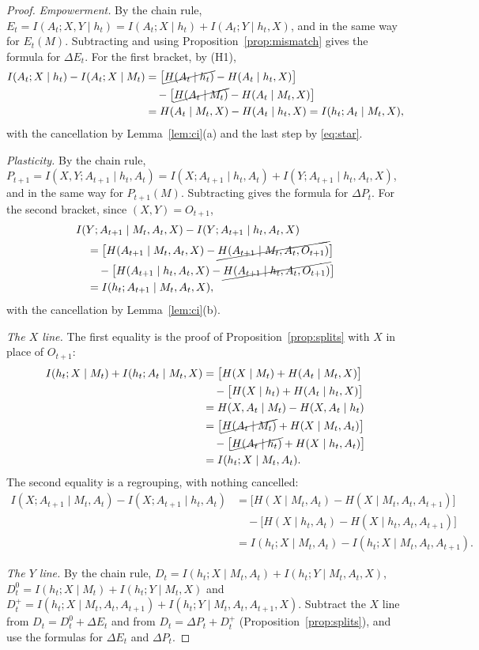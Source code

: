 \documentclass{article}
\theoremstyle{definition}
\theoremstyle{remark}
\newcommand{\dE}{\Delta E}
\newcommand{\dP}{\Delta P}
\begin{document}
\begin{proof}
\emph{Empowerment.} By the chain rule, $E_t=I(A_t;X,Y\mid h_t)=I(A_t;X\mid h_t)+I(A_t;Y\mid h_t,X)$, and in the same way for $E_t(M)$. Subtracting and using Proposition~\ref{prop:mismatch} gives the formula for $\dE_t$. For the first bracket, by (H1),
\begin{align*}
I(A_t;X\mid h_t)-I(A_t;X\mid M_t)
&=\big[\cancel{H(A_t\mid h_t)}-H(A_t\mid h_t,X)\big]\\
&\quad-\big[\cancel{H(A_t\mid M_t)}-H(A_t\mid M_t,X)\big]\\
&=H(A_t\mid M_t,X)-H(A_t\mid h_t,X)=I(h_t;A_t\mid M_t,X),
\end{align*}
with the cancellation by Lemma~\ref{lem:ci}(a) and the last step by \eqref{eq:star}.

\emph{Plasticity.} By the chain rule, $P_{t+1}=I(X,Y;A_{t+1}\mid h_t,A_t)=I(X;A_{t+1}\mid h_t,A_t)+I(Y;A_{t+1}\mid h_t,A_t,X)$, and in the same way for $P_{t+1}(M)$. Subtracting gives the formula for $\dP_t$. For the second bracket, since $(X,Y)=O_{t+1}$,
\begin{align*}
&I(Y;A_{t+1}\mid M_t,A_t,X)-I(Y;A_{t+1}\mid h_t,A_t,X)\\
&\quad=\big[H(A_{t+1}\mid M_t,A_t,X)-\cancel{H(A_{t+1}\mid M_t,A_t,O_{t+1})}\big]\\
&\qquad-\big[H(A_{t+1}\mid h_t,A_t,X)-\cancel{H(A_{t+1}\mid h_t,A_t,O_{t+1})}\big]\\
&\quad=I(h_t;A_{t+1}\mid M_t,A_t,X),
\end{align*}
with the cancellation by Lemma~\ref{lem:ci}(b).

\emph{The $X$ line.} The first equality is the proof of Proposition~\ref{prop:splits} with $X$ in place of $O_{t+1}$:
\begin{align*}
I(h_t;X\mid M_t)+I(h_t;A_t\mid M_t,X)
&=\big[H(X\mid M_t)+H(A_t\mid M_t,X)\big]\\
&\quad-\big[H(X\mid h_t)+H(A_t\mid h_t,X)\big]\\
&=H(X,A_t\mid M_t)-H(X,A_t\mid h_t)\\
&=\big[\cancel{H(A_t\mid M_t)}+H(X\mid M_t,A_t)\big]\\
&\quad-\big[\cancel{H(A_t\mid h_t)}+H(X\mid h_t,A_t)\big]\\
&=I(h_t;X\mid M_t,A_t).
\end{align*}
The second equality is a regrouping, with nothing cancelled:
\begin{align*}
I(X;A_{t+1}\mid M_t,A_t)-I(X;A_{t+1}\mid h_t,A_t)
&=\big[H(X\mid M_t,A_t)-H(X\mid M_t,A_t,A_{t+1})\big]\\
&\quad-\big[H(X\mid h_t,A_t)-H(X\mid h_t,A_t,A_{t+1})\big]\\
&=I(h_t;X\mid M_t,A_t)-I(h_t;X\mid M_t,A_t,A_{t+1}).
\end{align*}

\emph{The $Y$ line.} By the chain rule, $D_t=I(h_t;X\mid M_t,A_t)+I(h_t;Y\mid M_t,A_t,X)$, $D^0_t=I(h_t;X\mid M_t)+I(h_t;Y\mid M_t,X)$ and $D^+_t=I(h_t;X\mid M_t,A_t,A_{t+1})+I(h_t;Y\mid M_t,A_t,A_{t+1},X)$. Subtract the $X$ line from $D_t=D^0_t+\dE_t$ and from $D_t=\dP_t+D^+_t$ (Proposition~\ref{prop:splits}), and use the formulas for $\dE_t$ and $\dP_t$.
\end{proof}
\end{document}
